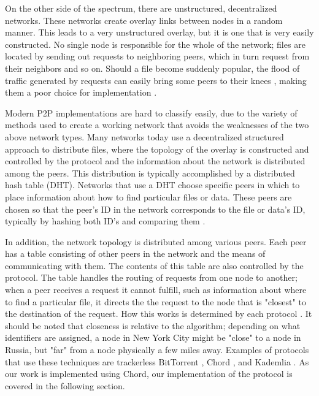 \documentclass[conference, compsocconf, letterpaper]{IEEEtran}
\begin{document}
On the other side of the spectrum, there are unstructured, decentralized networks.  These networks create overlay links between nodes in a random manner. This leads to a very unstructured overlay, but it is one that is very easily constructed.  No single node is responsible for the whole of the network;  files are located by sending out requests to neighboring peers, which in turn request from their neighbors and so on. Should a file become suddenly popular, the flood of traffic generated by requests can easily bring some peers to their knees \cite{Lv:2002:SRU:514191.514206}, making them a poor choice for implementation \cite{Overview}.

Modern P2P implementations are hard to classify easily, due to the variety of methods used to create a working network that avoids the weaknesses of the two above network types.  Many networks today use a decentralized structured approach to distribute files, where the topology of the overlay is constructed and controlled by the protocol and the information about the network is distributed among the peers.  This distribution is typically accomplished by a distributed hash table (DHT).  Networks that use a DHT choose specific peers in which to place information about how to find particular files or data.  These peers are chosen so that the peer's ID in the network corresponds to the file or data's ID, typically by hashing both ID's and comparing them  \cite{SurveyCompare}. 

In addition, the network topology is distributed among various peers.  Each peer has a table consisting of other peers in the network and the means of communicating with them.  The contents of this table are also controlled by the protocol.  The table handles the routing of requests from one node to another; when a peer receives a request it cannot fulfill, such as information about where to find a particular file, it directs the the request to the node that is "closest" to the destination of the request. How this works is determined by each protocol \cite{Chord}.  It should be noted that closeness is relative to the algorithm; depending on what identifiers are assigned, a node in New York City might be "close" to a node in Russia, but "far" from a node physically a few miles away.  Examples of protocols that use these techniques are trackerless BitTorrent \cite{BitTorrent}, Chord \cite{Chord}, and Kademlia \cite{Kademlia}.  As our work is implemented using Chord, our implementation of the protocol is covered in the following section. 
\end{document}
